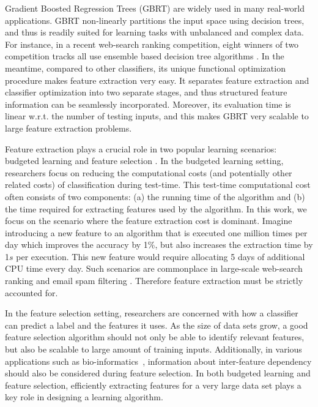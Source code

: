 
Gradient Boosted Regression Trees (GBRT) \citep{friedman2001greedy} are widely used in many real-world applications. GBRT non-linearly partitions the input space using decision trees, and thus is readily suited for learning tasks with unbalanced and complex data. For instance, in a recent web-search ranking competition, eight winners of two competition tracks all use ensemble based decision tree algorithms \citep{chapelle2011yahoo}. In the meantime, compared to other classifiers, its unique functional optimization procedure makes feature extraction very easy. It separates feature extraction and classifier optimization into two separate stages, and thus structured feature information can be seamlessly incorporated. Moreover, its evaluation time is linear w.r.t. the number of testing inputs, and this makes GBRT very scalable to large feature extraction problems.

Feature extraction plays a crucial role %
in two popular learning scenarios: budgeted learning \citep{xu2014classifier} and feature selection \citep{guyon2003introduction}. In the budgeted learning setting, researchers focus on reducing the computational costs (and potentially other related costs) of classification during test-time. This test-time computational cost often consists of two components: (a) the running time of the algorithm and (b) the time required for extracting features used by the algorithm. In this work, we focus on the scenario where the feature extraction cost is dominant. Imagine introducing a new feature to an algorithm that is executed one million times per day which improves the accuracy by 1\%, but also increases the extraction time by 1$s$ per execution. %
This new feature would require allocating 5 days of additional CPU time every day. Such scenarios are commonplace in large-scale web-search ranking \citep{zheng2007general} and email spam filtering \citep{weinberger2009feature}. Therefore feature extraction must be strictly accounted for. 

In the feature selection setting, researchers are concerned with how a classifier can predict a label and the features it uses. As the size of data sets grow, %
a good feature selection algorithm should not only be able to identify relevant features, but also be scalable to large amount of training inputs. Additionally, in various applications such as bio-informatics~\citep{saeys2007review}, information about inter-feature dependency should also be considered during feature selection. In both budgeted learning and feature selection, efficiently extracting features for a very large data set plays a key role in designing a learning algorithm.

